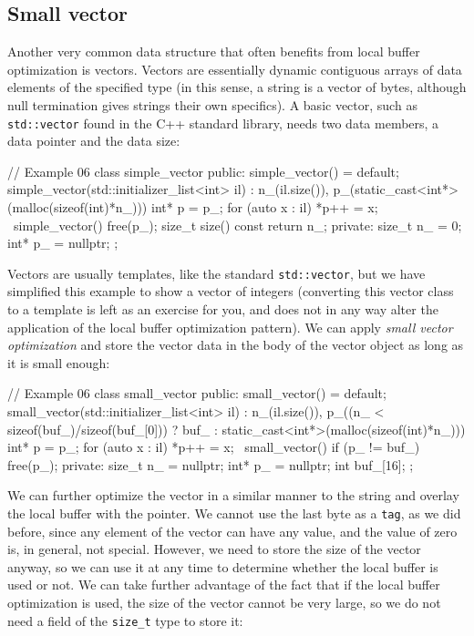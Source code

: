 \subsection{Small vector}

Another very common data structure that often benefits from local buffer optimization is vectors. Vectors are essentially dynamic contiguous arrays of data elements of the specified type (in this sense, a string is a vector of bytes, although null termination gives strings their own specifics). A basic vector, such as \texttt{std::vector} found in the C++ standard library, needs two data members, a data pointer and the data size:

\begin{code}
// Example 06
class simple_vector {
  public:
  simple_vector() = default;
  simple_vector(std::initializer_list<int> il) :
    n_(il.size()),
    p_(static_cast<int*>(malloc(sizeof(int)*n_)))
  {
    int* p = p_;
    for (auto x : il) *p++ = x;
  }
  ~simple_vector() { free(p_); }
  size_t size() const { return n_; }
  private:
  size_t n_ = 0;
  int* p_ = nullptr;
};
\end{code}

Vectors are usually templates, like the standard \texttt{std::vector}, but we have simplified this example to show a vector of integers (converting this vector class to a template is left as an exercise for you, and does not in any way alter the application of the local buffer optimization pattern). We can apply \emph{small vector optimization} and store the vector data in the body of the vector object as long as it is small enough:

\begin{code}
// Example 06
class small_vector {
  public:
  small_vector() = default;
  small_vector(std::initializer_list<int> il) :
    n_(il.size()), p_((n_ < sizeof(buf_)/sizeof(buf_[0]))
      ? buf_ : static_cast<int*>(malloc(sizeof(int)*n_)))
  {
    int* p = p_;
    for (auto x : il) *p++ = x;
  }
  ~small_vector() {
    if (p_ != buf_) free(p_);
  }
  private:
  size_t n_ = nullptr;
  int* p_ = nullptr;
  int buf_[16];
};
\end{code}

We can further optimize the vector in a similar manner to the string and overlay the local buffer with the pointer. We cannot use the last byte as a \texttt{tag}, as we did before, since any element of the vector can have any value, and the value of zero is, in general, not special. However, we need to store the size of the vector anyway, so we can use it at any time to determine whether the local buffer is used or not. We can take further advantage of the fact that if the local buffer optimization is used, the size of the vector cannot be very large, so we do not need a field of the \texttt{size\_t} type to store it:

